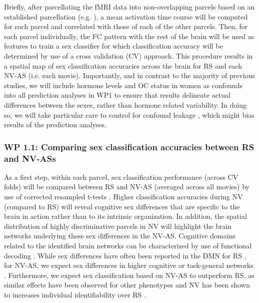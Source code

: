 \documentclass[11pt,a4paper]{article}
\begin{document}
Briefly, after parcellating the fMRI data into non-overlapping parcels based on an established parcellation 
(e.g. \parencite{schaeferLocalGlobalParcellationHuman2018}), 
a mean activation time course will be computed for each parcel and correlated with those of each of the other parcels. 
Then, for each parcel individually, the FC pattern with the rest of the brain will be used as features 
to train a sex classifier for which classification accuracy will be determined by use of a cross validation (CV) 
approach. This procedure results in a spatial map of sex classification accuracies across the brain for RS and each 
NV-AS (i.e. each movie). Importantly, and in contrast to the majority of previous studies, 
we will include hormone levels and OC status in women as confounds into all prediction analyses in WP1 to 
ensure that results delineate actual differences between the sexes, rather than hormone related variability. 
In doing so, we will take particular care to control for confound leakage \parencite{hamdanConfoundleakageConfoundRemoval2022a}, 
which might bias results of the prediction analyses. 
\subsubsection*{WP 1.1:  Comparing sex classification accuracies between RS and NV-ASs}
As a first step, within each parcel, sex classification performance (across CV folds) will be compared between RS and 
NV-AS (averaged across all movies) by use of corrected resampled t-tests \parencite{nadeauInferenceGeneralizationError2003a}. 
Higher classification accuracies during NV (compared to RS) will reveal cognitive sex differences 
that are specific to the brain in action rather than to its intrinsic organization. In addition, the spatial distribution of 
highly discriminative parcels in NV will highlight the brain networks underlying these sex differences in the NV-AS. Cognitive domains 
related to the identified brain networks can be characterized by use of functional decoding \parencite{foxMetaanalysisHumanNeuroimaging2014a}. 
While sex differences 
have often been reported in the DMN for RS \parencite{weisSexClassificationResting2020a,zhangFunctionalConnectivityPredicts2018}, 
for NV-AS, we expect sex differences in higher 
cognitive or task-general networks \parencite{hugdahlExistenceGeneralizedNonspecific2015a}. Furthermore, we expect sex classification 
based on NV-AS to outperform RS, as similar effects have been observed for other phenotypes 
\parencite{finnCanBrainState2017a,vanderwalIndividualDifferencesFunctional2017} and NV has been shown to increases individual 
identifiability over RS \parencite{krollNaturalisticViewingIncreases2023}. 
\end{document}
